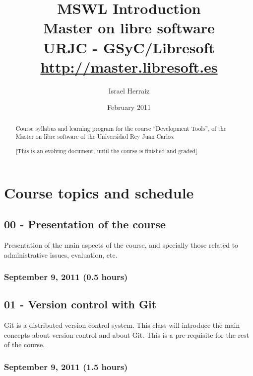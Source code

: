 \documentclass[a4paper]{article}
\title{MSWL Introduction \\
Master on libre software \\
URJC - GSyC/Libresoft \\
\url{http://master.libresoft.es}}
\author{Israel Herraiz}
\date{February 2011}
\begin{document}
\maketitle

\begin{abstract}
Course syllabus and learning program for the course ``Development
Tools'', of the Master on libre software of the Universidad Rey Juan
Carlos.

[This is an evolving document, until the course is finished and graded]
\end{abstract}

\tableofcontents

\section{Course topics and schedule}

\subsection{00 - Presentation of the course}

Presentation of the main aspects of the course, and specially those
related to administrative issues, evaluation, etc.

\subsubsection{September 9, 2011 (0.5 hours)}

\subsection{01 - Version control with Git}

Git is a distributed version control system. This class will introduce
the main concepts about version control and about Git. This is a
pre-requisite for the rest of the course.

\subsubsection{September 9, 2011 (1.5 hours)}
\end{document}
